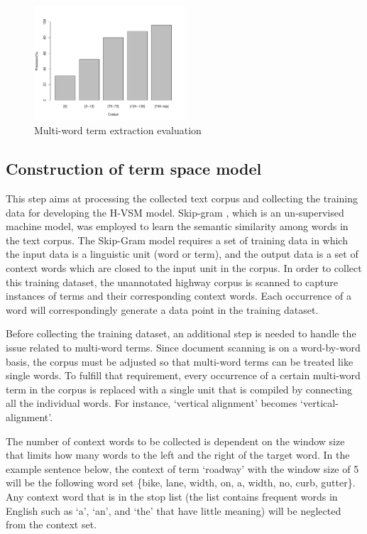 \documentclass[Journal, BackFigs, DoubleSpace]{ascelike}%
\begin{document}
\begin{figure}[t]
	\centering
	\includegraphics[width=0.5\textwidth]{Figure3_term_precision}
	\caption{Multi-word term extraction evaluation}
	\label{fig:term_precision}
\end{figure}
%
\subsection{Construction of term space model}
%
This step aims at processing the collected text corpus and collecting the training data for developing the H-VSM model. Skip-gram \cite{mikolov13a}, which is an un-supervised machine model, was employed to learn the semantic similarity among words in the text corpus. The Skip-Gram model requires a set of training data in which the input data is a linguistic unit (word or term), and the output data is a set of context words which are closed to the input unit in the corpus. In order to collect this training dataset, the unannotated highway corpus is scanned to capture instances of terms and their corresponding context words. Each occurrence of a word will correspondingly generate a data point in the training dataset.
\par
Before collecting the training dataset, an additional step is needed to handle the issue related to multi-word terms. Since document scanning is on a word-by-word basis, the corpus must be adjusted so that multi-word terms can be treated like single words. To fulfill that requirement, every occurrence of a certain multi-word term in the corpus is replaced with a single unit that is compiled by connecting all the individual words. For instance, `vertical alignment' becomes `vertical-alignment'.
\par
The number of context words to be collected is dependent on the window size that limits how many words to the left and the right of the target word. In the example sentence below, the context of term `roadway' with the window size of 5 will be the following word set \{bike, lane, width, on, a, width, no, curb, gutter\}. Any context word that is in the stop list (the list contains frequent words in English such as `a', `an', and `the' that have little meaning) will be neglected from the context set.
\end{document}
